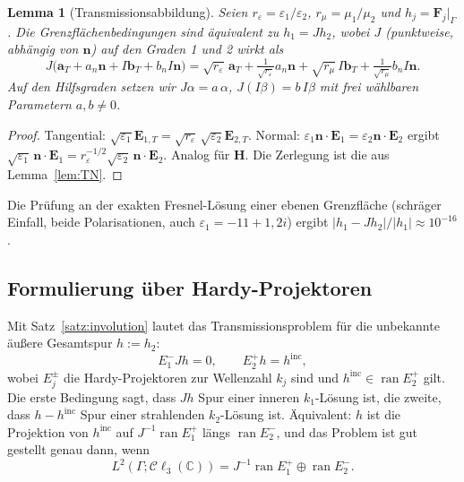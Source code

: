 \documentclass[11pt, a4paper]{article}
\newcommand{\mvec}[1]{\boldsymbol{#1}}
\newcommand{\clc}{\mathcal{C}\ell_{3}(\mathbb{C})}
\newcommand{\n}{\mvec{n}}
\theoremstyle{plain}
\newtheorem{lemma}[satz]{Lemma}
\theoremstyle{definition}
\newcommand{\status}[1]{\hfill{\small\sffamily[#1]}}
\begin{document}
\begin{lemma}[Transmissionsabbildung]\label{lem:J}\status{bewiesen, num.\ verif.}
Seien $r_\varepsilon = \varepsilon_1/\varepsilon_2$, $r_\mu = \mu_1/\mu_2$ und
$h_j = \mvec{F}_j|_\Gamma$. Die Grenzflächenbedingungen sind äquivalent zu
$h_1 = Jh_2$, wobei $J$ (punktweise, abhängig von $\n$) auf den Graden 1 und 2 wirkt als
\[
  J\big(\mvec{a}_T + a_n\n + I\mvec{b}_T + b_nI\n\big)
  = \sqrt{r_\varepsilon}\,\mvec{a}_T + \tfrac{1}{\sqrt{r_\varepsilon}}a_n\n
  + \sqrt{r_\mu}\,I\mvec{b}_T + \tfrac{1}{\sqrt{r_\mu}}b_nI\n .
\]
Auf den Hilfsgraden setzen wir $J\alpha = a\,\alpha$, $J(I\beta) = b\,I\beta$ mit
frei wählbaren Parametern $a,b\neq0$.
\end{lemma}
\begin{proof}
Tangential: $\sqrt{\varepsilon_1}\mvec{E}_{1,T} = \sqrt{r_\varepsilon}\,
\sqrt{\varepsilon_2}\mvec{E}_{2,T}$. Normal: $\varepsilon_1\n\cdot\mvec{E}_1 =
\varepsilon_2\n\cdot\mvec{E}_2$ ergibt $\sqrt{\varepsilon_1}\,\n\cdot\mvec{E}_1 =
r_\varepsilon^{-1/2}\sqrt{\varepsilon_2}\,\n\cdot\mvec{E}_2$. Analog für
$\mvec{H}$. Die Zerlegung ist die aus Lemma~\ref{lem:TN}.
\end{proof}

Die Prüfung an der exakten Fresnel-Lösung einer ebenen Grenzfläche
(schräger Einfall, beide Polarisationen, auch $\varepsilon_1 = -11+1{,}2i$) ergibt
$|h_1-Jh_2|/|h_1|\approx10^{-16}$.

\subsection{Formulierung über Hardy-Projektoren}
Mit Satz~\ref{satz:involution} lautet das Transmissionsproblem für die
unbekannte äußere Gesamtspur $h := h_2$:
\begin{equation}\label{eq:trans}
  E^-_{1}Jh = 0,\qquad E^+_{2}h = h^{\mathrm{inc}},
\end{equation}
wobei $E^\pm_j$ die Hardy-Projektoren zur Wellenzahl $k_j$ sind und
$h^{\mathrm{inc}}\in\operatorname{ran}E_2^+$ gilt. Die erste Bedingung sagt,
dass $Jh$ Spur einer inneren $k_1$-Lösung ist, die zweite, dass $h-h^{\mathrm{inc}}$
Spur einer strahlenden $k_2$-Lösung ist. Äquivalent: $h$ ist die Projektion von
$h^{\mathrm{inc}}$ auf $J^{-1}\operatorname{ran}E_1^+$ längs
$\operatorname{ran}E_2^-$, und das Problem ist gut gestellt genau dann, wenn
\begin{equation}\label{eq:split}
  L^2(\Gamma;\clc) = J^{-1}\operatorname{ran}E_1^+ \oplus \operatorname{ran}E_2^- .
\end{equation}
\end{document}
